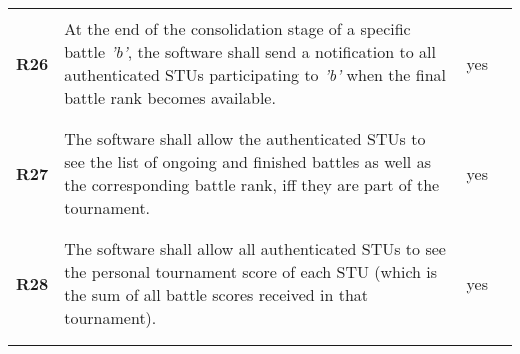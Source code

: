 \begin{longtable}[H]{l p{8cm} l p{2cm}}
                 &                                                                                                                                                                                                                       &                      &                                                                                         \\\hline & & & \\
    \textbf{R26} & At the end of the consolidation stage of a specific battle \textit{'b'}, the software shall send a notification to all authenticated STUs participating to \textit{'b'} when the final battle rank becomes available. & {\color{green}yes}   &                                                                                         \\
                 &                                                                                                                                                                                                                       &                      &                                                                                         \\\hline & & & \\
    \textbf{R27} & The software shall allow the authenticated STUs to see the list of ongoing and finished battles as well as the corresponding battle rank, iff they are part of the tournament.                                        & {\color{green}yes}   &                                                                                         \\
                 &                                                                                                                                                                                                                       &                      &                                                                                         \\\hline & & & \\
    \textbf{R28} & The software shall allow all authenticated STUs to see the personal tournament score of each STU (which is the sum of all battle scores received in that tournament).                                                 & {\color{green}yes}   &                                                                                         \\
                 &                                                                                                                                                                                                                       &                      &                                                                                         \\\hline & & & \\

\end{longtable}
